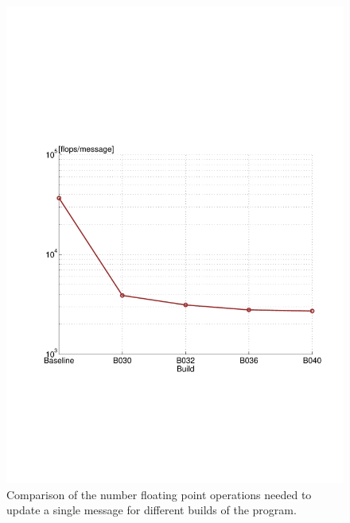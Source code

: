 \begin{figure}\centering
    \includegraphics[scale=0.48, trim={2cm 6.5cm 1cm 8.5cm},clip]{graphics/flops_per_message.pdf}
  \caption{Comparison of the number floating point operations needed to update a single message for different builds of the program.\label{flops-per-message}}
\end{figure}

